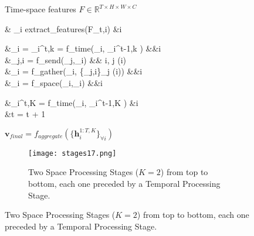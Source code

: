 \documentclass{article}
\begin{document}
\begin{figure}
\begin{minipage}[!tp]{.52\textwidth}
\begin{algorithm}[H]
\begin{algorithmic}\vspace{1mm}
    Time-space features $F \in \mathbb{R}^{T\times H \times W \times C}$
\vspace{3mm}
   \REPEAT
    \vspace{-6mm}
    \STATE
    \begin{flalign*}
     & _i \gets extract\_features(F_t,i) \qquad &\forall i
\end{flalign*}
    \vspace{-4mm}
\vspace{-4mm}
  \STATE
  \begin{flalign*} 
      &_{i} = _{i}^{t,k} = f_{time}(_{i},           _{i}^{t-1,k} ) &&\forall i\\
&_{j,i} = f_{send}(_j,_i) 
        && \forall i, \forall j \in {}(i)\\
      &_{i} = f_{gather}(_i, \{_{j,i}\}_{j \in {}(i)})  &&\forall i \\
      &_{i} = f_{space}(_i,_i)  &&\forall i 
\end{flalign*}

   \ENDFOR
\begin{flalign*}
      &_{i}^{t,K} = f_{time}(_{i},  _{i}^{t-1,K} ) \qquad\qquad &\forall i\\
      &t = t + 1
  \end{flalign*}
   \vspace{-5mm}
    \vspace{2mm}
    \STATE $\mathbf{v}_{final} = f_{aggregate}(\{\mathbf{h}_{i}^{1:T,K}\}_{\forall i})$ 
\vspace{2mm}
\end{algorithmic}
 \caption{Space-time processing in RSTG model. 
}
   \label{alg:main_model}
\end{algorithm}
\end{minipage}
\begin{minipage}[!tp]{.35\textwidth}
    \begin{figure}[H]
\begin{center}
    \centerline{\texttt{[image: stages17.png]}}
    \caption{ Two Space Processing Stages ($K=2$) from top to bottom, each one preceded by a Temporal Processing Stage. }


    \label{fig:processing_stages}
    \end{center}
    \vskip -0.2in
    \end{figure}

\end{minipage}
\end{figure}
\end{document}
